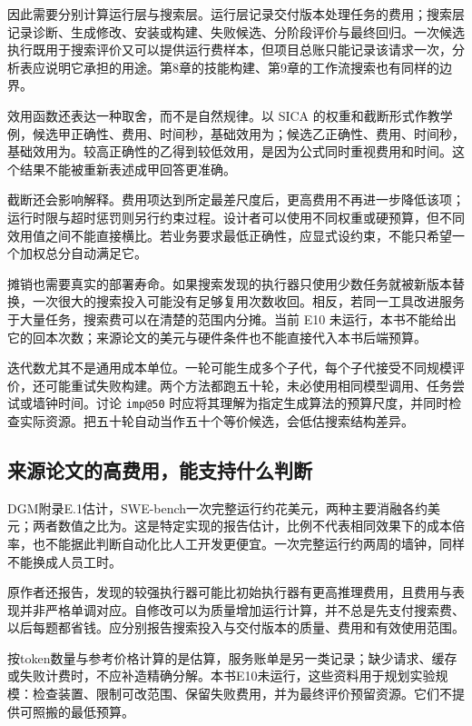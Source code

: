 因此需要分别计算运行层与搜索层。运行层记录交付版本处理任务的费用；搜索层记录诊断、生成修改、安装或构建、失败候选、分阶段评价与最终回归。一次候选执行既用于搜索评价又可以提供运行费样本，但项目总账只能记录该请求一次，分析表应说明它承担的用途。第8章的技能构建、第9章的工作流搜索也有同样的边界。

效用函数还表达一种取舍，而不是自然规律。以 SICA 的权重和截断形式作教学例，候选甲正确性、费用、时间秒，基础效用为；候选乙正确性、费用、时间秒，基础效用为。较高正确性的乙得到较低效用，是因为公式同时重视费用和时间。这个结果不能被重新表述成甲回答更准确。

截断还会影响解释。费用项达到所定最差尺度后，更高费用不再进一步降低该项；运行时限与超时惩罚则另行约束过程。设计者可以使用不同权重或硬预算，但不同效用值之间不能直接横比。若业务要求最低正确性，应显式设约束，不能只希望一个加权总分自动满足它。

摊销也需要真实的部署寿命。如果搜索发现的执行器只使用少数任务就被新版本替换，一次很大的搜索投入可能没有足够复用次数收回。相反，若同一工具改进服务于大量任务，搜索费可以在清楚的范围内分摊。当前 E10 未运行，本书不能给出它的回本次数；来源论文的美元与硬件条件也不能直接代入本书后端预算。

迭代数尤其不是通用成本单位。一轮可能生成多个子代，每个子代接受不同规模评价，还可能重试失败构建。两个方法都跑五十轮，未必使用相同模型调用、任务尝试或墙钟时间。讨论 \texttt{imp@50} 时应将其理解为指定生成算法的预算尺度，并同时检查实际资源。把五十轮自动当作五十个等价候选，会低估搜索结构差异。


\subsection{来源论文的高费用，能支持什么判断}
\label{sec:ch12-reportedcost}

DGM附录E.1估计，SWE-bench一次完整运行约花美元，两种主要消融各约美元；两者数值之比为\cite{dgm-2505}。这是特定实现的报告估计，比例不代表相同效果下的成本倍率，也不能据此判断自动化比人工开发更便宜。一次完整运行约两周的墙钟，同样不能换成人员工时。

原作者还报告，发现的较强执行器可能比初始执行器有更高推理费用，且费用与表现并非严格单调对应\cite{dgm-2505}。自修改可以为质量增加运行计算，并不总是先支付搜索费、以后每题都省钱。应分别报告搜索投入与交付版本的质量、费用和有效使用范围。

按token数量与参考价格计算的是估算，服务账单是另一类记录；缺少请求、缓存或失败计费时，不应补造精确分解。本书E10未运行，这些资料用于规划实验规模：检查装置、限制可改范围、保留失败费用，并为最终评价预留资源。它们不提供可照搬的最低预算。

